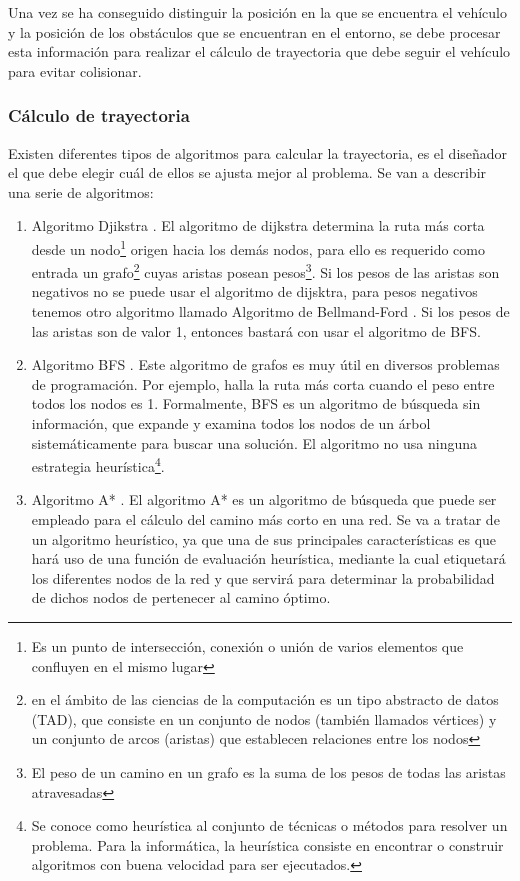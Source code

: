 Una vez se ha conseguido distinguir la posición en la que se encuentra el vehículo y la posición de los obstáculos que se encuentran en el entorno, se debe procesar esta información para realizar el cálculo de trayectoria que debe seguir el vehículo para evitar colisionar.

\subsubsection{Cálculo de trayectoria}

Existen diferentes tipos de algoritmos para calcular la trayectoria, es el diseñador el que debe elegir cuál de ellos se ajusta mejor al problema. Se van a describir una serie de algoritmos:

\begin{enumerate}
\item Algoritmo Djikstra \cite{AlgoritmoDjikstra}.  El algoritmo de dijkstra determina la ruta más corta desde un nodo\footnote{Es un punto de intersección, conexión o unión de varios elementos que confluyen en el mismo lugar} origen hacia los demás nodos, para ello es requerido como entrada un grafo\footnote{en el ámbito de las ciencias de la computación es un tipo abstracto de datos (TAD), que consiste en un conjunto de nodos (también llamados vértices) y un conjunto de arcos (aristas) que establecen relaciones entre los nodos} cuyas aristas posean pesos\footnote{El peso de un camino en un grafo es la suma de los pesos de todas las aristas atravesadas}. Si los pesos de las aristas son negativos no se puede usar el algoritmo de dijsktra, para pesos negativos tenemos otro algoritmo llamado Algoritmo de Bellmand-Ford \cite{AlgoritmoBellman}. Si los pesos de las aristas son de valor 1, entonces bastará con usar el algoritmo de \ac{BFS}.
\item Algoritmo \ac{BFS} \cite{AlgoritmoBFS}. Este algoritmo de grafos es muy útil en diversos problemas de programación. Por ejemplo, halla la ruta más corta cuando el peso entre todos los nodos es 1. Formalmente, \ac{BFS} es un algoritmo de búsqueda sin información, que expande y examina todos los nodos de un árbol sistemáticamente para buscar una solución. El algoritmo no usa ninguna estrategia heurística\footnote{Se conoce como heurística al conjunto de técnicas o métodos para resolver un problema. Para la informática, la heurística consiste en encontrar o construir algoritmos con buena velocidad para ser ejecutados.}.
\item Algoritmo A* \cite{AlgoritmoA}. El algoritmo A* es un algoritmo de búsqueda que puede ser empleado para el cálculo del camino más corto en una red. Se va a tratar de un algoritmo heurístico, ya que una de sus principales características es que hará uso de una función de evaluación heurística, mediante la cual etiquetará los diferentes nodos de la red y que servirá para determinar la probabilidad de dichos nodos de pertenecer al camino óptimo.
\end{enumerate}

